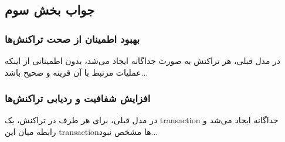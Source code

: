 \subsection*{جواب بخش سوم}

\subsubsection*{بهبود اطمینان از صحت تراکنش‌ها}
در مدل قبلی، هر تراکنش به صورت جداگانه ایجاد می‌شد، بدون اطمینانی از اینکه عملیات مرتبط با آن قرینه و صحیح باشد...

\subsubsection*{افزایش شفافیت و ردیابی تراکنش‌ها}
در مدل قبلی، برای هر طرف در تراکنش، یک transaction جداگانه ایجاد می‌شد و رابطه میان این transaction‌ها مشخص نبود...
